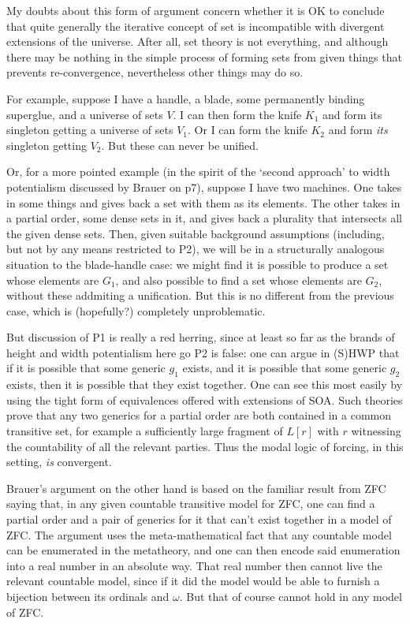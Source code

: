 \documentclass{article}
\begin{document}
My doubts about this form of argument concern whether it is OK to conclude 
that quite generally the iterative concept of set is incompatible with 
divergent extensions of the universe. After all, set theory is not everything, 
and although there may be nothing in the simple process of forming sets 
from given things that prevents 
re-convergence, nevertheless other things may do so. 

For example, suppose I have a handle, a blade, some permanently 
binding superglue, and a universe of sets $V$. I can then form the knife $K_1$
and form its singleton getting a universe of sets $V_1$. Or I can form 
the knife $K_2$ and form \emph{its} singleton getting $V_2$. But these 
can never be unified. 

Or, for a more pointed example (in the spirit of the `second approach' to width 
potentialism discussed by Brauer on p7), suppose I have two machines. 
One takes in some things and gives back a set with them as its elements.
The other takes in a 
partial order, some dense sets in it, and gives back a plurality that 
intersects all the given dense sets. Then, given suitable background assumptions 
(including, but not by any means restricted to P2),
we will be in a structurally analogous situation to the blade-handle 
case: we might find it is possible to produce a set whose elements are $G_1$,
and also possible to find a set whose elements are $G_2$,
without these addmiting a unification.
But this is no different from the previous case, which is (hopefully?) completely 
unproblematic.

But discussion of P1 is really a red herring, since at least so far as the 
brands of height and width potentialism here go P2 is false:
one can argue in (S)HWP that if it is possible that some generic 
$g_1$ exists, and it is possible that some generic $g_2$ exists, then it is 
possible that they exist together. One can see this most easily by using 
the tight form of equivalences offered with extensions of SOA. 
Such theories prove that
any two generics for a partial order are both contained in a common transitive 
set, for example a sufficiently large fragment of $L[r]$ with $r$ witnessing 
the countability of all the relevant parties.
Thus the modal logic of forcing, in this 
setting, \emph{is} convergent. 

Brauer's argument on the other hand is based on the familiar result from ZFC saying 
that, in any given countable transitive model for ZFC, one can find a partial 
order and a pair of generics for it that can't exist together in a model of ZFC.
The argument uses the meta-mathematical fact that any countable model can be 
enumerated in the metatheory, and one can then encode said enumeration into a 
real number in an absolute way. That real number then cannot live the relevant 
countable model, since if it did the model would be able to furnish a bijection 
between its ordinals and $\omega$. But that of course cannot hold in any model of ZFC.
\end{document}
